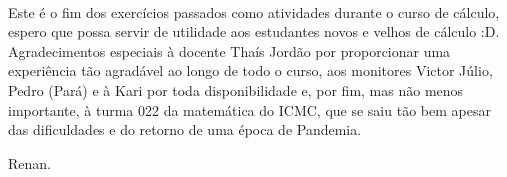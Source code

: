 \documentclass{article}
\begin{document}
\paragraph{} Este \'e o fim dos exerc\'icios passados como atividades durante o curso de c\'alculo, espero que 
possa servir de utilidade aos estudantes novos e velhos de c\'alculo :D. Agradecimentos especiais \`a docente 
Tha\'is Jord\~ao por proporcionar uma experi\^encia t\~ao agrad\'avel ao longo de todo o curso, aos monitores 
Victor J\'ulio, Pedro (Par\'a) e \`a Kari por toda disponibilidade e, por fim, mas n\~ao menos importante, \`a 
turma 022 da matem\'atica do ICMC, que se saiu t\~ao bem apesar das dificuldades e do retorno de uma \'epoca de Pandemia.

Renan. 
\end{document}
